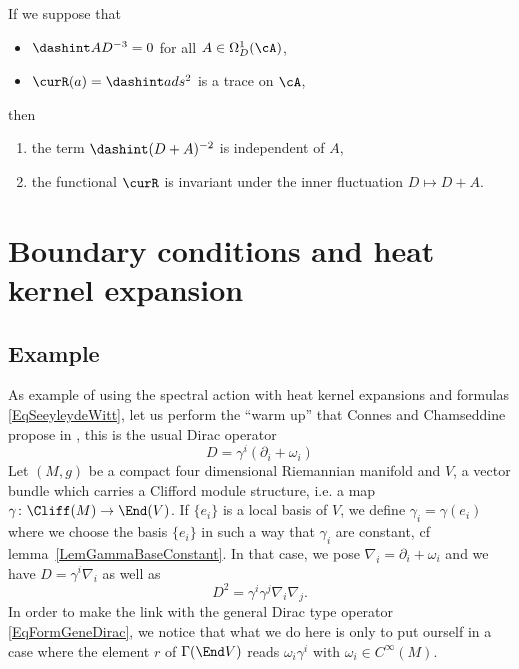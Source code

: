 \begin{proposition}
If we suppose that
\begin{itemize}
\item $\dashint AD^{-3}=0$ for all $A\in\Omega^1_D(\cA)$,
\item $\curR(a)=\dashint ads^2$ is a trace on $\cA$,
\end{itemize}
then
\begin{enumerate}
\item the term $\dashint (D+A)^{-2}$ is independent of $A$,
\item the functional $\curR$ is invariant under the inner fluctuation $D\mapsto D+A$.
\end{enumerate}
\end{proposition}



\section{Boundary conditions and heat kernel expansion}			\label{SecGravBoundCC}

\subsection{Example}

As example of using the spectral action with heat kernel expansions and formulas \eqref{EqSeeyleydeWitt}, let us perform the ``warm up'' that Connes and Chamseddine propose in \cite{QGBoundaryTermsSpectralAction}, this is the usual Dirac operator
\begin{equation}		\label{EqFormgenDiracD}
D=\gamma^i(\partial_i+\omega_i)
\end{equation}
Let $(M,g)$ be a compact four dimensional Riemannian manifold and $V$, a vector bundle which carries a Clifford module structure, i.e. a map $\gamma\colon \Cliff(M)\to \End(V)$. If $\{ e_i \}$ is a local basis of $V$, we define $\gamma_i=\gamma(e_i)$ where we choose the basis $\{ e_i \}$ in such a way that $\gamma_i$ are constant, cf lemma~\ref{LemGammaBaseConstant}. In that case, we pose $\nabla_i=\partial_i+\omega_i$ and we have $D=\gamma^i\nabla_i$ as well as
\[
  D^2=\gamma^i\gamma^j\nabla_i\nabla_j.
\]
In order to make the link with the general Dirac type operator \eqref{EqFormGeneDirac}, we notice that what we do here is only to put ourself in a case where the element $r$ of $\Gamma(\End V)$ reads $\omega_i\gamma^i$ with $\omega_i\in C^{\infty}(M)$.

